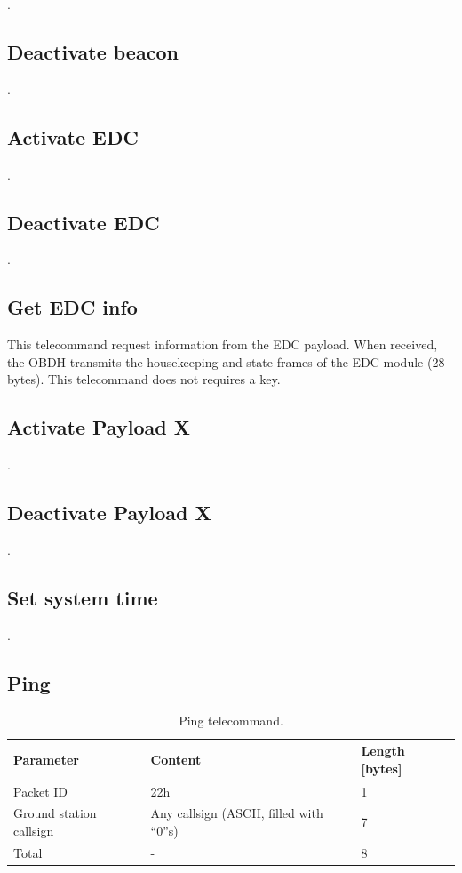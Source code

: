 .

\subsection{Deactivate beacon}

.

\subsection{Activate EDC}

.

\subsection{Deactivate EDC}

.

\subsection{Get EDC info}

This telecommand request information from the EDC payload. When received, the OBDH transmits the housekeeping and state frames of the EDC module (28 bytes). This telecommand does not requires a key.

\subsection{Activate Payload X}

.

\subsection{Deactivate Payload X}

.

\subsection{Set system time}

.

\subsection{Ping}

\begin{table}[!h]
    \centering
    \begin{tabular}{lll}
        \toprule[1.5pt]
        \textbf{Parameter}      & \textbf{Content}                         & \textbf{Length [bytes]} \\
        \midrule
        Packet ID               & 22h                                      & 1 \\
        Ground station callsign & Any callsign (ASCII, filled with ``0''s) & 7 \\
        \midrule
        Total                   & -                                        & 8 \\
        \bottomrule[1.5pt]
    \end{tabular}
    \caption{Ping telecommand.}
    \label{tab:ping-tc}
\end{table}

